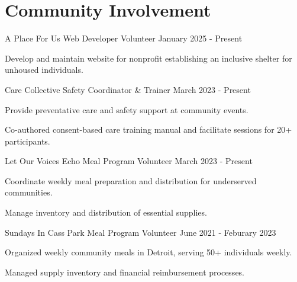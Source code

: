 \documentclass{../styles/cv}
\begin{document}
\section{Community Involvement}

\subsectionpositiondate
    {A Place For Us}
    {Web Developer Volunteer}
    {January 2025 - Present}
\resumesublistbegin
    \item Develop and maintain website for nonprofit establishing an inclusive shelter for unhoused individuals.
\resumesublistend

\subsectionpositiondate
    {Care Collective}
    {Safety Coordinator \& Trainer}
    {March 2023 - Present}
\resumesublistbegin
    \item Provide preventative care and safety support at community events.
    \item Co-authored consent-based care training manual and facilitate sessions for 20+ participants.
\resumesublistend

\subsectionpositiondate
    {Let Our Voices Echo}
    {Meal Program Volunteer}
    {March 2023 - Present}
\resumesublistbegin
    \item Coordinate weekly meal preparation and distribution for underserved communities.
    \item Manage inventory and distribution of essential supplies.
\resumesublistend

\subsectionpositiondate
    {Sundays In Cass Park}
    {Meal Program Volunteer}
    {June 2021 - Feburary 2023}
\resumesublistbegin
    \item Organized weekly community meals in Detroit, serving 50+ individuals weekly.
    \item Managed supply inventory and financial reimbursement processes.
\resumesublistend
\end{document}
